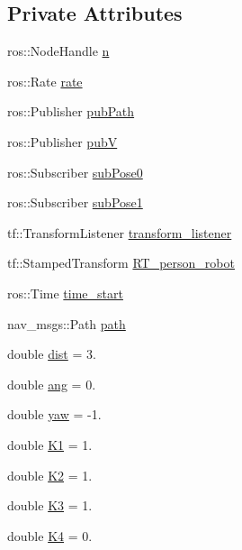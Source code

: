 \subsection*{Private Attributes}
\begin{DoxyCompactItemize}
\item 
ros\+::\+Node\+Handle \hyperlink{classMpc__node_a6d876c2baef47329ce66b8747b918eb4}{n}
\item 
ros\+::\+Rate \hyperlink{classMpc__node_accb78ea73903c0a6164b794d0450a0b0}{rate}
\item 
ros\+::\+Publisher \hyperlink{classMpc__node_a4c51498e7db8875e951c637e891b5e62}{pub\+Path}
\item 
ros\+::\+Publisher \hyperlink{classMpc__node_a4191433cb5c29c422a6ac11abfb2c08f}{pubV}
\item 
ros\+::\+Subscriber \hyperlink{classMpc__node_a97fdf7b8912632aac250aeb4a515d38f}{sub\+Pose0}
\item 
ros\+::\+Subscriber \hyperlink{classMpc__node_aec569d4ea7254ec9893ce79b94ce2eba}{sub\+Pose1}
\item 
tf\+::\+Transform\+Listener \hyperlink{classMpc__node_acca5492f6ed78d47688621941d11d1b2}{transform\+\_\+listener}
\item 
tf\+::\+Stamped\+Transform \hyperlink{classMpc__node_a8688cf07e5ddc56acf1448503b3f5984}{R\+T\+\_\+person\+\_\+robot}
\item 
ros\+::\+Time \hyperlink{classMpc__node_a5412f969d238133ee5a5a40928811932}{time\+\_\+start}
\item 
nav\+\_\+msgs\+::\+Path \hyperlink{classMpc__node_a6da2728783a52910d4c378a3f66aec06}{path}
\item 
double \hyperlink{classMpc__node_a28803c0f092db658637ece996aad7e90}{dist} = 3.
\item 
double \hyperlink{classMpc__node_a44c011b9b0c84002f5e9cb057c9a2d59}{ang} = 0.
\item 
double \hyperlink{classMpc__node_a9b5da0aaf367d5b1f60f47eca976de2a}{yaw} = -\/1.
\item 
double \hyperlink{classMpc__node_a5c4d6221612047ebd47b0c0fe462db67}{K1} = 1.
\item 
double \hyperlink{classMpc__node_a78c903e351af27fd9e4b92c2a4d40210}{K2} = 1.
\item 
double \hyperlink{classMpc__node_a4a889c942598f48d5ec29f45e7c98478}{K3} = 1.
\item 
double \hyperlink{classMpc__node_a0b2df940218a00cdfbedb434bb108d5a}{K4} = 0.
\item 

\end{DoxyCompactItemize}

